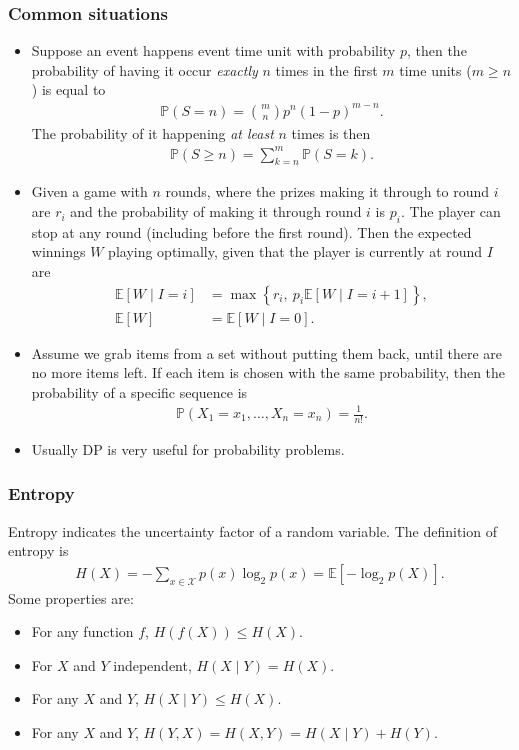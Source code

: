 \subsubsection{Common situations}
\begin{itemize}
    \item Suppose an event happens event time unit with probability $p$, then the probability of having it occur \textit{exactly} $n$ times in the first $m$ time units ($m \geq n$) is equal to
    \begin{align*}
        \mathbb P(S = n) = \binom{m}{n} p^{n}(1-p)^{m-n}.
    \end{align*}
    The probability of it happening \textit{at least} $n$ times is then
    \begin{align*}
        \mathbb P(S \geq n) = \sum_{k=n}^m \mathbb P(S = k).
    \end{align*}
    \item Given a game with $n$ rounds, where the prizes making it through to round $i$ are $r_i$ and the probability of making it through round $i$ is $p_i$. The player can stop at any round (including before the first round). Then the expected winnings $W$ playing optimally, given that the player is currently at round $I$ are
    \begin{align*}
        \mathbb E[W \mid I = i] &= \max\left\{r_i,\ p_i\mathbb E[W \mid I = i + 1]\right\}, \\
        \mathbb E[W] &= \mathbb E[W \mid I = 0].
    \end{align*}
    \item Assume we grab items from a set without putting them back, until there are no more items left. If each item is chosen with the same probability, then the probability of a specific sequence is
    \begin{align*}
        \mathbb P(X_1 = x_1, \dots, X_n = x_n) = \frac1{n!}.
    \end{align*}
    \item Usually DP is very useful for probability problems.
\end{itemize}

\subsubsection{Entropy}

Entropy indicates the uncertainty factor of a random variable. The definition of entropy is
\begin{align*}
    H(X) = -\sum_{x\in\mathcal X}p(x)\log_2 p(x) = \mathbb E[-\log_2 p(X)].
\end{align*}
Some properties are:
\begin{itemize}
    \item For any function $f$, $H(f(X)) \leq H(X)$.
    \item For $X$ and $Y$ independent, $H(X\mid Y) = H(X)$.
    \item For any $X$ and $Y$, $H(X\mid Y) \leq H(X)$.
    \item For any $X$ and $Y$, $H(Y, X) = H(X,Y) = H(X\mid Y) + H(Y)$.
\end{itemize}



